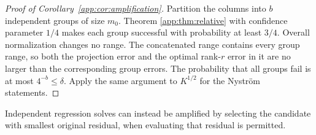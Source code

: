 \documentclass[11pt,a4paper]{article}
\theoremstyle{definition}\newtheorem{definition}[theorem]{Definition}
\theoremstyle{remark}\newtheorem{remark}[theorem]{Remark}
\numberwithin{equation}{section}
\begin{document}
\begin{proof}[Proof of Corollary~\ref{app:cor:amplification}]
\label{proof:amplification}
Partition the columns into $b$ independent groups of size $m_0$. Theorem
\ref{app:thm:relative} with confidence parameter $1/4$ makes each group
successful with probability at least $3/4$. Overall normalization changes
no range. The concatenated range contains every group range, so both the
projection error and the optimal rank-$r$ error in it are no larger than
the corresponding group errors. The probability that all groups fail is
at most $4^{-b}\le\delta$. Apply the same argument to $K^{1/2}$ for the
Nystr\"om statements.
\end{proof}
Independent regression solves
can instead be amplified by selecting the candidate with smallest original
residual, when evaluating that residual is permitted.
\end{document}

